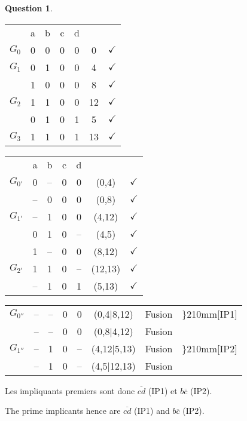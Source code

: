 \documentclass[11pt,a4paper,dvipsnames]{article}
\theoremstyle{definition}%
\newtheorem{Q}{Question}[] %
\newcommand{\fr}[1]{
 	\ifthenelse {\boolean{fr}} {#1} {}
 }
\newcommand{\en}[1]{
 	\ifthenelse {\boolean{en}} {#1} {}
 }
\begin{document}
\begin{Q}
\begin{enumerate}
{		\begin{minipage}{0.5\textwidth}
			\begin{tabular}{ccccccc}
			 & a & b & c & d & & \\
			 $G_0$ & 0 & 0 & 0 & 0 & 0 & $\checkmark$ \\ \hline
			 $G_1$ & 0 & 1 & 0 & 0 & 4 & $\checkmark$ \\
			 & 1 & 0 & 0 & 0 & 8 & $\checkmark$ \\ \hline
			 $G_2$ & 1 & 1 & 0 & 0 & 12 & $\checkmark$ \\
			 & 0 & 1 & 0 & 1 & 5 & $\checkmark$ \\ \hline
			 $G_3$ & 1 & 1 & 0 & 1 & 13 & $\checkmark$ \\
			\end{tabular}
		\end{minipage}%
		\begin{minipage}{0.5\textwidth}
			\begin{tabular}{ccccccc}
			 & a & b & c & d & & \\
			 $G_{0'}$ & 0 & -- & 0 & 0 & (0,4) & $\checkmark$ \\
			 & -- & 0 & 0 & 0 & (0,8) & $\checkmark$ \\ \hline
			 $G_{1'}$ & -- & 1 & 0 & 0 & (4,12) & $\checkmark$ \\
			 & 0 & 1 & 0 & -- & (4,5) & $\checkmark$ \\
			 & 1 & -- & 0 & 0 & (8,12) & $\checkmark$ \\ \hline
			 $G_{2'}$ & 1 & 1 & 0 & -- & (12,13) & $\checkmark$ \\
			 & -- & 1 & 0 & 1 & (5,13) & $\checkmark$ \\
			\end{tabular}
		\end{minipage}
		\begin{center}
			\begin{tabular}{cccccccc}
			$G_{0''}$ & -- & -- & 0 & 0 & (0,4|8,12) & Fusion & \rdelim\}{2}{10mm}[IP1] \\
			& -- & -- & 0 & 0 & (0,8|4,12) & Fusion \\ \hline
			$G_{1''}$ & -- & 1 & 0 & -- & (4,12|5,13) & Fusion & \rdelim\}{2}{10mm}[IP2] \\
			& -- & 1 & 0 & -- & (4,5|12,13) & Fusion \\
			\end{tabular}
		\end{center}

		\fr{Les impliquants premiers sont donc $\overline{cd}$ (IP1) et $b\overline{c}$ (IP2).}
		\en{The prime implicants hence are $\overline{cd}$ (IP1) and $b\overline{c}$ (IP2).}

}
\end{enumerate}
\end{Q}
\end{document}
